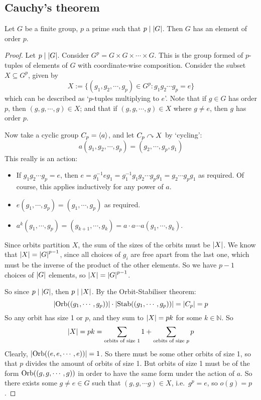 \subsection{Cauchy's theorem}
\begin{theorem}
	Let \(G\) be a finite group, \(p\) a prime such that \(p \mid \abs{G}\).
	Then \(G\) has an element of order \(p\).
\end{theorem}
\begin{proof}
	Let \(p \mid \abs{G}\).
	Consider \(G^p = G \times G \times \cdots \times G\).
	This is the group formed of \(p\)-tuples of elements of \(G\) with coordinate-wise composition.
	Consider the subset \(X \subseteq G^p\), given by
	\[
		X := \{ (g_1, g_2, \cdots, g_p) \in G^p: g_1g_2\cdots g_p = e \}
	\]
	which can be described as `\(p\)-tuples multiplying to \(e\)'.
	Note that if \(g \in G\) has order \(p\), then \((g, g, \cdots, g) \in X\); and that if \((g, g, \cdots, g) \in X\) where \(g \neq e\), then \(g\) has order \(p\).

	Now take a cyclic group \(C_p = \langle{} a \rangle\), and let \(C_p \curvearrowright X\) by `cycling':
	\[
		a(g_1, g_2, \cdots, g_p) = (g_2, \cdots, g_p, g_1)
	\]
	This really is an action:
	\begin{itemize}
		\item If \(g_1g_2 \cdots g_p = e\), then \(e = g_1^{-1} e g_1 = g_1^{-1}g_1g_2 \cdots g_p g_1 = g_2 \cdots g_p g_1\) as required.
		      Of course, this applies inductively for any power of \(a\).
		\item \(e(g_1, \cdots, g_p) = (g_1, \cdots, g_p)\) as required.
		\item \(a^k(g_1, \cdots, g_p) = (g_{k+1}, \cdots, g_k) = a \cdot a \cdots a(g_1, \cdots, g_k)\).
	\end{itemize}
	Since orbits partition \(X\), the sum of the sizes of the orbits must be \(\abs{X}\).
	We know that \(\abs{X} = \abs{G}^{p-1}\), since all choices of \(g_i\) are free apart from the last one, which must be the inverse of the product of the other elements.
	So we have \(p-1\) choices of \(\abs{G}\) elements, so \(\abs{X} = \abs{G}^{p-1}\).

	So since \(p \mid \abs{G}\), then \(p \mid \abs{X}\).
	By the Orbit-Stabiliser theorem:
	\[
		\abs{\operatorname{Orb}((g_1, \cdots, g_p))} \cdot \abs{\operatorname{Stab}((g_1, \cdots, g_p))} = \abs{C_p} = p
	\]
	So any orbit has size 1 or \(p\), and they sum to \(\abs{X} = pk\) for some \(k \in \mathbb N\).
	So
	\[
		\abs{X} = pk = \sum_{\text{orbits of size 1}} 1 + \sum_{\text{orbits of size \(p\)}} p
	\]
	Clearly, \(\abs{\operatorname{Orb}((e, e, \cdots, e))} = 1\).
	So there must be some other orbits of size 1, so that \(p\) divides the amount of orbits of size 1.
	But orbits of size 1 must be of the form \(\operatorname{Orb}((g, g, \cdots, g))\) in order to have the same form under the action of \(a\).
	So there exists some \(g \neq e \in G\) such that \((g, g, \cdots g) \in X\), i.e.\ \(g^p = e\), so \(o(g) = p\).
\end{proof}
